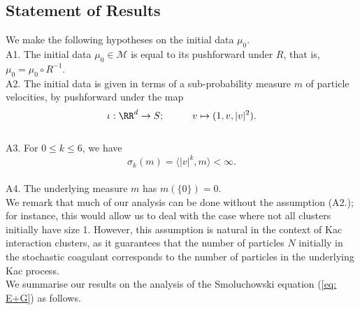 \subsection{Statement of Results}\label{sec: results}

We make the following hypotheses on the initial data $\mu_0$.
\\A1. The initial data $\mu_0 \in \mathcal{M}$ is equal to its pushforward under $R$, that is, $\mu_0 = \mu_0 \circ R^{-1}$.
\\ A2. The initial data is given in terms of a sub-probability measure $m$ of particle velocities, by pushforward under the map
\begin{equation}
    \iota: \RR^d \rightarrow S; \hspace{1cm} v\mapsto (1, v, |v|^2).
\end{equation}
\\ {A3.} For $0\leq k\leq 6$, we have
\begin{equation}
    \sigma_k(m)=\langle |v|^k, m\rangle <\infty.
\end{equation} 
\\ {A4.} The underlying measure $m$ has $m(\{0\})=0.$
\\We remark that much of our analysis can be done without the assumption (A2.); for instance, this would allow us to deal with the case where not all clusters initially have size 1. However, this assumption is natural in the context of Kac interaction clusters, as it guarantees that the number of particles $N$ initially in the stochastic coagulant corresponds to the number of particles in the underlying Kac process. 
\\ We summarise our results on the analysis of the Smoluchowski equation (\ref{eq: E+G}) as follows.
